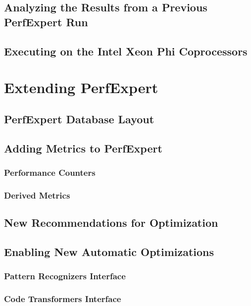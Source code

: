\section{Analyzing the Results from a Previous PerfExpert Run}

\section{Executing on the Intel\textsuperscript{\textregistered} Xeon Phi\textsuperscript{\texttrademark} Coprocessors}

\chapter{Extending PerfExpert}
\label{extending}

\section{PerfExpert Database Layout}

\section{Adding Metrics to PerfExpert}

\subsection{Performance Counters}

\subsection{Derived Metrics}

\section{New Recommendations for Optimization}

\section{Enabling New Automatic Optimizations}

\subsection{Pattern Recognizers Interface}

\subsection{Code Transformers Interface}
